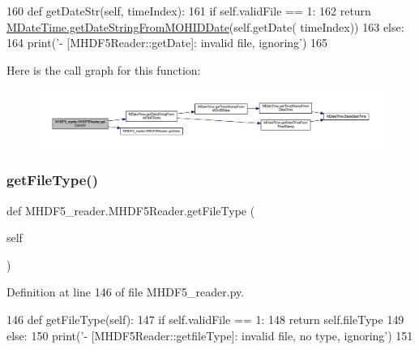 \begin{DoxyCode}
160     \textcolor{keyword}{def }getDateStr(self, timeIndex):
161         \textcolor{keywordflow}{if} self.validFile == 1:            
162             \textcolor{keywordflow}{return} \mbox{\hyperlink{namespace_m_date_time_a57cf43e4864af605636039c5a06672c8}{MDateTime.getDateStringFromMOHIDDate}}(self.getDate(
      timeIndex))
163         \textcolor{keywordflow}{else}:
164             print(\textcolor{stringliteral}{'- [MHDF5Reader::getDate]: invalid file, ignoring'})
165             
\end{DoxyCode}
Here is the call graph for this function\+:\nopagebreak
\begin{figure}[H]
\begin{center}
\leavevmode
\includegraphics[width=350pt]{class_m_h_d_f5__reader_1_1_m_h_d_f5_reader_a81ca43bbc8a077b4daf07e07bba3e31d_cgraph}
\end{center}
\end{figure}
\mbox{\label{class_m_h_d_f5__reader_1_1_m_h_d_f5_reader_af878d42810452ebceffe648bd04970d1}} 
\subsubsection{\texorpdfstring{get\+File\+Type()}{getFileType()}}
{\footnotesize\ttfamily def M\+H\+D\+F5\+\_\+reader.\+M\+H\+D\+F5\+Reader.\+get\+File\+Type (\begin{DoxyParamCaption}\item[{}]{self }\end{DoxyParamCaption})}



Definition at line 146 of file M\+H\+D\+F5\+\_\+reader.\+py.


\begin{DoxyCode}
146     \textcolor{keyword}{def }getFileType(self):
147         \textcolor{keywordflow}{if} self.validFile == 1:
148             \textcolor{keywordflow}{return} self.fileType
149         \textcolor{keywordflow}{else}:
150             print(\textcolor{stringliteral}{'- [MHDF5Reader::getfileType]: invalid file, no type, ignoring'})
151      
\end{DoxyCode}
\mbox{\label{class_m_h_d_f5__reader_1_1_m_h_d_f5_reader_aa433954c98bbb5384bbd25e523ca1925}} 
